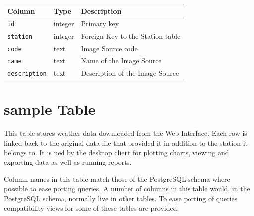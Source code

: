 \documentclass[a4paper,10pt]{book}
\begin{document}
\begin{tabular}{p{2.5cm} p{2.5cm} l}
\hline
\textbf{Column} & \textbf{Type} & \textbf{Description} \\
\hline
\verb|id| & integer & Primary key\\
\verb|station| & integer & Foreign Key to the Station table\\
\verb|code| & text & Image Source code\\
\verb|name| & text & Name of the Image Source\\
\verb|description| & text & Description of the Image Source\\
\hline
\end{tabular}

\section{sample Table}
This table stores weather data downloaded from the Web Interface. Each row is linked back to the original data file that provided it in addition to the station it belongs to. It is ued by the desktop client for plotting charts, viewing and exporting data as well as running reports.

Column names in this table match those of the PostgreSQL schema where possible to ease porting queries. A number of columns in this table would, in the PostgreSQL schema, normally live in other tables. To ease porting of queries compatibility views for some of these tables are provided.
\end{document}
